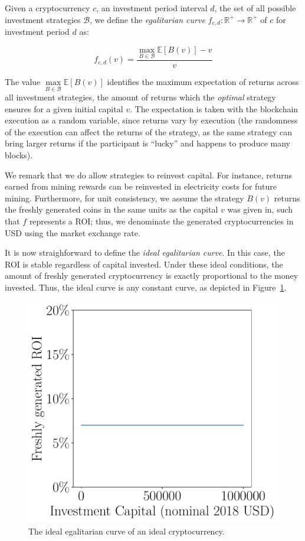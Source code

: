 \begin{definition}
    Given a cryptocurrency $c$, an investment period interval $d$, the set of
    all possible investment strategies $\mathcal{B}$, we define the \emph{egalitarian curve}
    $f_{c,d}: \mathbb{R}^+ \longrightarrow \mathbb{R}^+$ of $c$ for
    investment period $d$ as:

    \[
        f_{c,d}(v) = \frac{\underset{B \in \mathcal{B}}{\max}{\mathbb{E}[B(v)]} - v}{v}
    \]
\end{definition}

The value $\underset{B \in \mathcal{B}}{\max}{\mathbb{E}[B(v)]}$ identifies the maximum expectation of
returns across all investment strategies, \ie the amount of
returns which the \emph{optimal} strategy ensures for a given initial capital $v$.
The expectation is taken with the blockchain execution as a random variable,
since returns vary by execution (the randomness of the execution can affect the
returns of the strategy, as the same strategy can bring larger returns if the
participant is ``lucky'' and happens to produce many blocks).

We remark that we do allow strategies to reinvest capital. For instance,
returns earned from mining rewards can be reinvested in electricity costs for
future mining. Furthermore, for unit consistency, we assume the strategy
$B(v)$ returns the freshly generated coins in the same units as the capital $v$
was given in, such that $f$ represents a ROI; thus, we denominate the
generated cryptocurrencies in USD using the market exchange rate.

It is now straighforward to define the \emph{ideal egalitarian curve}. In this
case, the ROI is stable regardless of capital invested. Under these ideal
conditions, the amount of freshly generated cryptocurrency is exactly
proportional to the money invested. Thus, the ideal curve is any constant
curve, as depicted in Figure~\ref{fig:ideal}.

\begin{figure}
    \centering
    \includegraphics[width=0.4 \columnwidth,keepaspectratio]{figures/ideal.pdf}
    \caption{The ideal egalitarian curve of an ideal cryptocurrency.}
    \label{fig:ideal}
\end{figure}

